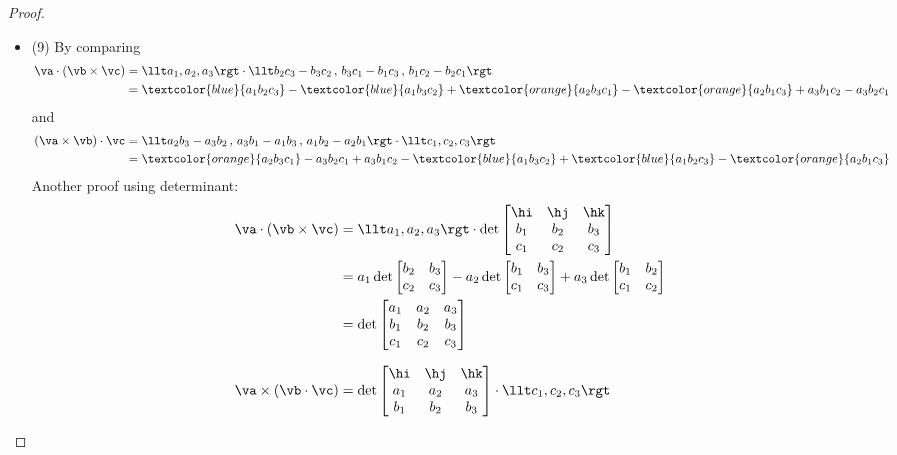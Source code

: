 \begin{proof}
\begin{itemize}
\begin{efig}
\begin{center}
\end{center}
\end{efig}
\item (9) By comparing
\begin{align*}
\va\cdot(\vb\times\vc) &=\llt a_1,a_2,a_3\rgt\cdot\llt b_2c_3-b_3c_2\,,\, b_3c_1-b_1c_3\,,\, b_1c_2-b_2c_1\rgt\\
&=\textcolor{blue}{a_1b_2c_3} - \textcolor{blue}{a_1b_3c_2} + \textcolor{orange}{a_2b_3c_1} - \textcolor{orange}{a_2b_1c_3}
+ a_3b_1c_2 - a_3b_2c_1
\end{align*}
and
\begin{align*}
(\va\times\vb)\cdot\vc &=\llt a_2b_3-a_3b_2\,,\, a_3b_1-a_1b_3\,,\, a_1b_2-a_2b_1\rgt\cdot\llt c_1,c_2,c_3\rgt \\
&=\textcolor{orange}{a_2b_3c_1} - a_3b_2c_1 + a_3b_1c_2 - \textcolor{blue}{a_1b_3c_2} + \textcolor{blue}{a_1b_2c_3}
- \textcolor{orange}{a_2b_1c_3}
\end{align*}
Another proof using determinant:
\begin{align*}
\va\cdot(\vb\times\vc)
&=\llt a_1,a_2,a_3\rgt\cdot\det\left[\begin{matrix}\hi&\hj&\hk\\
b_1&b_2&b_3\\
c_1&c_2&c_3\end{matrix}\right]\\
&=a_1\det\left[\begin{matrix}
b_2&b_3\\
c_2&c_3\end{matrix}\right]
-a_2\det\left[\begin{matrix}
b_1&b_3\\
c_1&c_3\end{matrix}\right]
+a_3\det\left[\begin{matrix}
b_1&b_2\\
c_1&c_2\end{matrix}\right]\\
&=\det\left[\begin{matrix}a_1&a_2&a_3\\
b_1&b_2&b_3\\
c_1&c_2&c_3\end{matrix}\right]\\[0.1in]
\va\times(\vb\cdot\vc)
&=\det\left[\begin{matrix}\hi&\hj&\hk\\
a_1&a_2&a_3\\
b_1&b_2&b_3\end{matrix}\right]\cdot\llt c_1,c_2,c_3\rgt\\

\end{align*}
\end{itemize}
\end{proof}
